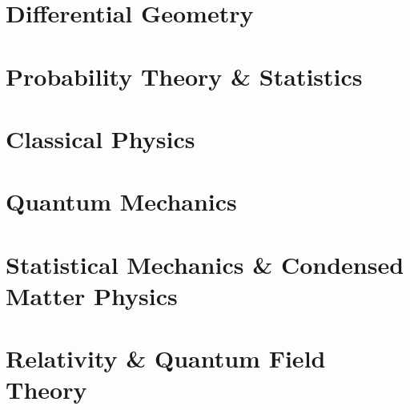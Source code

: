\documentclass[11pt, a4paper]{report}
\begin{document}
\part{Differential Geometry}\label{part:diffgeom}

















\part{Probability Theory \& Statistics}






\part{Classical Physics}






\part{Quantum Mechanics}









\part{Statistical Mechanics \& Condensed Matter Physics}





\part{Relativity \& Quantum Field Theory}








\end{document}

